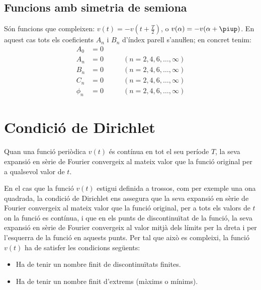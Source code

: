 \subsection{Funcions amb simetria de semiona}

Són funcions que compleixen: $v(t) = -v(t+\frac{T}{2})$, o $v(\alpha) = -v(\alpha+\piup)$. En aquest
cas tots els coeficients $A_n$ i $B_n$ d'índex parell s'anuŀlen;
en concret tenim:
\begin{subequations}
\begin{alignat}{2}
    A_0 &= 0       & \\[0.5ex]
    A_n &= 0       &\qquad (n = 2,4,6,\ldots,\infty)\\[0.5ex]
    B_n &= 0       &\qquad (n = 2,4,6,\ldots,\infty)\\[0.5ex]
    C_n &= 0       &\qquad (n = 2,4,6,\ldots,\infty)\\[0.5ex]
    \phi_n &= 0 &\qquad (n = 2,4,6,\ldots,\infty)
\end{alignat}
\end{subequations}

\section{Condició de Dirichlet}

Quan una funció periòdica $v(t)$  és contínua en tot el seu període
$T$, la seva expansió en sèrie de Fourier convergeix al mateix valor
que la funció original per a qualsevol valor de $t$.

En el cas que la funció $v(t)$ estigui definida a trossos, com per
exemple una ona quadrada, la condició de Dirichlet ens assegura que
la seva expansió en sèrie de Fourier convergeix al mateix valor que
la funció original, per a tots els valors de $t$ on la funció es
contínua, i que en els punts de discontinuïtat de la funció, la seva
expansió en sèrie de Fourier convergeix al valor mitjà dels límits
per la dreta i per l'esquerra de la funció en aquests punts. Per tal
que això es compleixi, la funció $v(t)$ ha de satisfer les condicions
següents:
\begin{itemize}
   \item Ha de tenir un nombre finit de discontinuïtats
   finites.
   \item Ha de tenir un nombre finit d'extrems (màxims o mínims).
\end{itemize}

